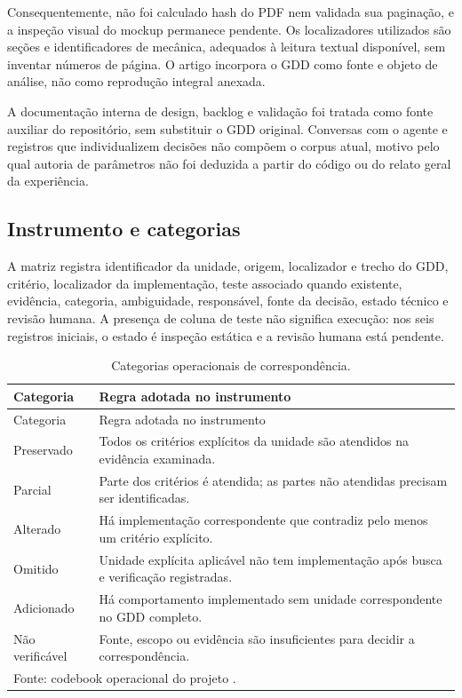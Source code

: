 Consequentemente, não foi calculado hash do PDF nem validada sua paginação, e a inspeção visual do mockup permanece pendente. Os localizadores utilizados são seções e identificadores de mecânica, adequados à leitura textual disponível, sem inventar números de página. O artigo incorpora o GDD como fonte e objeto de análise, não como reprodução integral anexada.

A documentação interna de design, backlog e validação foi tratada como fonte auxiliar do repositório, sem substituir o GDD original. Conversas com o agente e registros que individualizem decisões não compõem o corpus atual, motivo pelo qual autoria de parâmetros não foi deduzida a partir do código ou do relato geral da experiência.

\subsection{Instrumento e categorias}
A matriz registra identificador da unidade, origem, localizador e trecho do GDD, critério, localizador da implementação, teste associado quando existente, evidência, categoria, ambiguidade, responsável, fonte da decisão, estado técnico e revisão humana. A presença de coluna de teste não significa execução: nos seis registros iniciais, o estado é inspeção estática e a revisão humana está pendente.

\begin{singlespace}
\begin{longtable}{p{}p{}}
\caption{Categorias operacionais de correspondência.}\label{tab:categories}\\
\toprule Categoria & Regra adotada no instrumento \\\midrule\endfirsthead
\toprule Categoria & Regra adotada no instrumento \\\midrule\endhead
Preservado & Todos os critérios explícitos da unidade são atendidos na evidência examinada.\\
Parcial & Parte dos critérios é atendida; as partes não atendidas precisam ser identificadas.\\
Alterado & Há implementação correspondente que contradiz pelo menos um critério explícito.\\
Omitido & Unidade explícita aplicável não tem implementação após busca e verificação registradas.\\
Adicionado & Há comportamento implementado sem unidade correspondente no GDD completo.\\
Não verificável & Fonte, escopo ou evidência são insuficientes para decidir a correspondência.\\
\bottomrule
\multicolumn{2}{l}{\footnotesize Fonte: codebook operacional do projeto .}\\
\end{longtable}
\end{singlespace}

